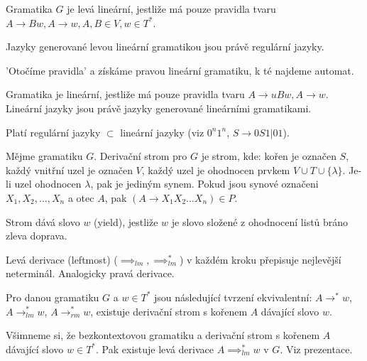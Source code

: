 \documentclass[12pt]{article}                   %
\begin{document}
    \begin{definice}
        Gramatika $G$ je levá lineární, jestliže má pouze pravidla tvaru $A \rightarrow Bw, A \rightarrow w, A, B \in V, w \in T^*$.
    \end{definice}

    \begin{lemma}
        Jazyky generované levou lineární gramatikou jsou právě regulární jazyky.

        \begin{dukazin}
            'Otočíme pravidla' a získáme pravou lineární gramatiku, k té najdeme automat.
        \end{dukazin}
    \end{lemma}

    \begin{definice}
        Gramatika je lineární, jestliže má pouze pravidla tvaru $A \rightarrow uBw, A \rightarrow w$. Lineární jazyky jsou právě jazyky generované lineárními gramatikami.
    \end{definice}

    \begin{upozorneni}
        Platí regulární jazyky $\subset$ lineární jazyky (viz $0^n1^n$, $S \rightarrow 0S1|01$).
    \end{upozorneni}

    \begin{definice}
        Mějme gramatiku $G$. Derivační strom pro $G$ je strom, kde: kořen je označen $S$, každý vnitřní uzel je označen $V$, každý uzel je ohodnocen prvkem $V \cup T \cup \{\lambda\}$. Je-li uzel ohodnocen $\lambda$, pak je jediným synem. Pokud jsou synové označeni $X_1, X_2, …, X_n$ a otec $A$, pak $(A \rightarrow X_1X_2…X_n) \in P$.
    \end{definice}

    \begin{definice}
        Strom dává slovo $w$ (yield), jestliže $w$ je slovo složené z ohodnocení listů bráno zleva doprava.
    \end{definice}

    \begin{definice}
        Levá derivace (leftmost) ($\implies_{lm}, \implies_{lm}^*$) v každém kroku přepisuje nejlevější neterminál. Analogicky pravá derivace.
    \end{definice}

    \begin{veta}
        Pro danou gramatiku $G$ a $w \in T^*$ jsou následující tvrzení ekvivalentní: $A \rightarrow^* w$, $A \rightarrow_{lm}^* w$, $A \rightarrow_{rm}^* w$, existuje derivační strom s kořenem $A$ dávající slovo $w$.

        \begin{dukazin}
            Všimneme si, že bezkontextovou gramatiku a derivační strom s kořenem $A$ dávající slovo $w \in T^*$. Pak existuje levá derivace $A \implies_{lm}^* w$ v $G$. Viz prezentace.
        \end{dukazin}
    \end{veta}
\end{document}
